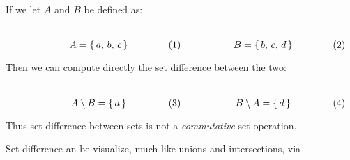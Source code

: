         \begin{example}
            If we let $A$ and $B$ be defined as:
            \par
            \begin{subequations}
                \begin{minipage}[b]{0.49\textwidth}
                    \centering
                    \begin{equation}
                        A=\{\,a,\,b,\,c\,\}
                    \end{equation}
                \end{minipage}
                \hfill
                \begin{minipage}[b]{0.49\textwidth}
                    \centering
                    \begin{equation}
                        B=\{\,b,\,c,\,d\,\}
                    \end{equation}
                \end{minipage}
            \end{subequations}
            \par\vspace{2.5ex}
            Then we can compute directly the set difference between the two:
            \par
            \begin{subequations}
                \begin{minipage}[b]{0.49\textwidth}
                    \centering
                    \begin{equation}
                        A\setminus{B}=\{\,a\,\}
                    \end{equation}
                \end{minipage}
                \hfill
                \begin{minipage}[b]{0.49\textwidth}
                    \centering
                    \begin{equation}
                        B\setminus{A}=\{\,d\,\}
                    \end{equation}
                \end{minipage}
            \end{subequations}
            \par\vspace{2.5ex}
            Thus set difference between sets is not a \textit{commutative} set
            operation.
        \end{example}
        Set difference an be visualize, much like unions and intersections, via
